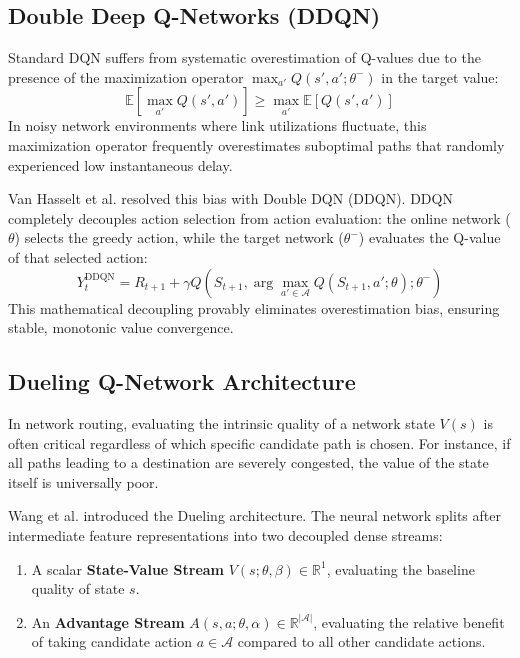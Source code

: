\subsection{Double Deep Q-Networks (DDQN)}
Standard DQN suffers from systematic overestimation of Q-values due to the presence of the maximization operator $\max_{a'} Q(s', a'; \theta^-)$ in the target value:
\begin{equation}
    \mathbb{E}\left[ \max_{a'} Q(s', a') \right] \ge \max_{a'} \mathbb{E}\left[ Q(s', a') \right]
\end{equation}
In noisy network environments where link utilizations fluctuate, this maximization operator frequently overestimates suboptimal paths that randomly experienced low instantaneous delay.

Van Hasselt et al. \cite{vanhasselt2016deep} resolved this bias with Double DQN (DDQN). DDQN completely decouples action selection from action evaluation: the online network ($\theta$) selects the greedy action, while the target network ($\theta^-$) evaluates the Q-value of that selected action:
\begin{equation}
    Y_t^{\text{DDQN}} = R_{t+1} + \gamma Q\left(S_{t+1}, \arg\max_{a' \in \mathcal{A}} Q(S_{t+1}, a'; \theta); \theta^-\right)
    \label{eq:double_dqn_target}
\end{equation}
This mathematical decoupling provably eliminates overestimation bias, ensuring stable, monotonic value convergence.

\subsection{Dueling Q-Network Architecture}
In network routing, evaluating the intrinsic quality of a network state $V(s)$ is often critical regardless of which specific candidate path is chosen. For instance, if all paths leading to a destination are severely congested, the value of the state itself is universally poor.

Wang et al. \cite{wang2016dueling} introduced the Dueling architecture. The neural network splits after intermediate feature representations into two decoupled dense streams:
\begin{enumerate}
    \item A scalar \textbf{State-Value Stream} $V(s; \theta, \beta) \in \mathbb{R}^1$, evaluating the baseline quality of state $s$.
    \item An \textbf{Advantage Stream} $A(s, a; \theta, \alpha) \in \mathbb{R}^{|\mathcal{A}|}$, evaluating the relative benefit of taking candidate action $a \in \mathcal{A}$ compared to all other candidate actions.
\end{enumerate}

